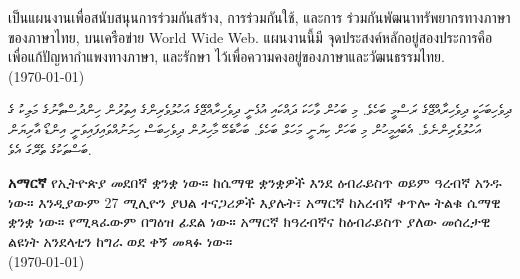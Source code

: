 \documentclass[a4paper]{article}
\begin{document}
\begin{thai}
เป็น\wbr แผนงานเพื่อ\wbr สนับสนุน\wbr การ\wbr ร่วมกัน\wbr สร้าง, การ\wbr ร่วมกันใช้, และ\wbr การ%
ร่วมกัน\wbr พัฒนา\wbr ทรัพยากร\wbr ทาง\wbr ภาษา\wbr ของ\wbr ภาษา\wbr ไทย, บน\wbr เครือข่าย World Wide Web. แผนงานนี้\wbr มี%
จุด\wbr ประสงค์หลั\wbr กอยู่\wbr สอง\wbr ประการคือ เพื่อแก้ปัญหา\wbr กำ\wbr แพง\wbr ทาง\wbr ภาษา, และรักษา%
ไว้เพื่อ\wbr ความค\wbr งอยู่\wbr ของ\wbr ภาษา\wbr และ\wbr วัฒนธรรม\wbr ไทย. \\
(\today)
\end{thai}

\begin{divehi}\small\sloppy
ދިވެހިބަހަކީ ދިވެހިރާއްޖޭގެ ރަސްމީ ބަހެވެ. މި ބަހުން ވާހަކަ ދައްކައި އުޅެނީ ދިވެހިރާއްޖޭގެ އަހުލުވެރިންގެ އިތުރުން ހިންދުސްތާނުގެ މަލިކު ގެ
އަހުލުވެރިންނެވެ. އެބައިމީހުން މި ބަހަށް ކިޔަނީ މަހަލް ބަހެވެ. ބަހާބެހޭ މާހިރުން ދިވެހިބަސް ހިމަނުއްވައިފައިވަނީ އިންޑޯ އާރިޔަން ބަސްތަކުގެ
ތެރޭގަ އެވެ. 
\end{divehi}

%

\begin{amharic}
\textbf{አማርኛ} የኢትዮጵያ መደበኛ ቋንቋ ነው። ከሴማዊ ቋንቋዎች እንደ ዕብራይስጥ ወይም ዓረብኛ አንዱ ነው። እንዲያውም 27 ሚሊዮን ያህል ተናጋሪዎች እያሉት፣ አማርኛ ከአረብኛ ቀጥሎ ትልቁ ሴማዊ ቋንቋ ነው። የሚጻፈውም በግዕዝ ፊደል ነው። አማርኛ ክዓረብኛና ከዕብራይስጥ ያለው መሰረታዊ ልዩነት አንደላቲን ከግራ ወደ ቀኝ መጻፉ ነው። \\
(\today)
\end{amharic}
\end{document}
